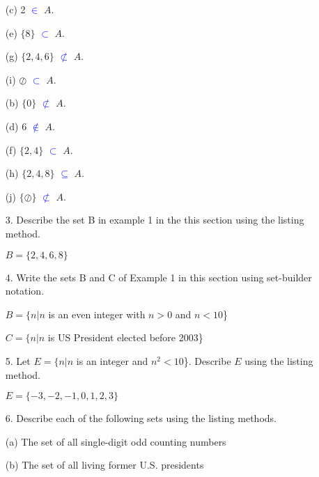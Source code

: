 \documentclass{article}
\begin{document}
\begin{itemize}
\begin{multicols}{2}
        (c) 2 \textcolor{blue}{$\in$} $A$.
        
        (e) $\{8\}$ \textcolor{blue}{$\subset$} $A$.
        
        (g) $\{2,4,6\}$ \textcolor{blue}{$\not\subset$} $A$.
        
        (i) $\oslash$ \textcolor{blue}{$\subset$} $A$.
        
        \columnbreak
        (b) $\{0\}$ \textcolor{blue}{$\not\subset$}  $A$.
        
        (d) 6 \textcolor{blue}{$\notin$} $A$.
        
        (f) $\{2,4\}$ \textcolor{blue}{$\subset$} $A$.
        
        (h) $\{2,4,8\}$ \textcolor{blue}{$\subseteq$} $A$.
        
        (j) $\{\oslash\}$ \textcolor{blue}{$\not\subset$} $A$.
        
        \end{multicols}
        
    \newpage
    \item[3.] Describe the set B in example 1 in the this section using the listing method.

    {\color{blue} $B = \{2,4,6,8\}$}
    
    \item[4.] Write the sets B and C of Example 1 in this section using set-builder notation.
    
    {\color{blue} $B = \{n|n $ is an even integer with $n > 0$ and $n < 10$\}}
    
    {\color{blue} $C = \{n|n$ is US President elected before 2003\}}
    
    \item[5.] Let $E = \{n|n$ is an integer and $n^2 < 10$\}. Describe $E$ using the listing method.
    
    {\color{blue} $E = \{-3, -2, -1, 0, 1, 2, 3\}$}
    
    \item[6.] Describe each of the following sets using the listing methods.
    
    (a) The set of all single-digit odd counting numbers\\
    
    (b) The set of all living former U.S. presidents\\
    

\end{itemize}
\end{document}
